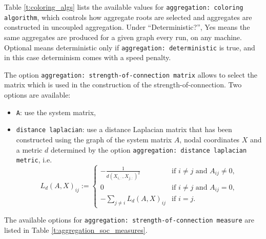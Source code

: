 Table \ref{t:coloring_algs} lists the available values for \verb!aggregation: coloring algorithm!, which controls how aggregate roots are selected and aggregates are constructed in uncoupled aggregation. Under ``Deterministic?'', Yes means the same aggregates are produced for a given graph every run, on any machine. Optional means deterministic only if \verb!aggregation: deterministic! is true, and in this case determinism comes with a speed penalty.



The option \texttt{aggregation: strength-of-connection matrix} allows to select the matrix which is used in the construction of the strength-of-connection.
Two options are available:
\begin{itemize}
\item \texttt{A}: use the system matrix,
\item \texttt{distance laplacian}: use a distance Laplacian matrix that has been constructed using the graph of the system matrix \(A\), nodal coordinates \(X\) and a metric \(d\) determined by the option \texttt{aggregation: distance laplacian metric}, i.e.
  \begin{equation}
    L_{d}(A, X)_{ij} :=
    \begin{cases}
      -\frac{1}{d(X_{i,:},X_{j,:})^{2}} & \text{if } i\neq j \text{ and } A_{ij}\neq 0,\\
      0 & \text{if } i\neq j \text{ and } A_{ij}= 0,\\
      -\sum_{j\neq i}L_{d}(A, X)_{ij} & \text{if } i=j.
    \end{cases}
  \end{equation}
\end{itemize}

The available options for \texttt{aggregation: strength-of-connection measure} are listed in Table \ref{t:aggregation_soc_measures}.

